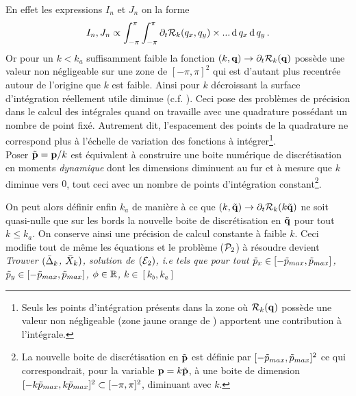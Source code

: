 \documentclass[10.5pt]{article}
\begin{document}
\begin{multicols}{2}
En effet les expressions $I_n$ et $J_n$ on la forme
\begin{equation}
	I_n, J_n \propto \int_{-\pi}^{\pi}  \int_{-\pi}^{\pi} \partial_t \mathcal{R}_k(q_x, q_y)\times ... \, \text{d} \, q_x \, \text{d} \, q_y \, .
\end{equation}
Or pour un $k < k_a$ suffisamment faible la fonction $(k,{\bf q}) \to \partial_t \mathcal{R}_k({\bf q})$ possède une valeur non négligeable sur une zone de $[-\pi, \pi]^2$ qui est d'autant plus recentrée autour de l'origine que $k$ est faible. Ainsi pour $k$ décroissant la surface d'intégration réellement utile diminue (c.f. ). Ceci pose des problèmes de précision dans le calcul des intégrales quand on travaille avec une quadrature possédant un nombre de point fixé. Autrement dit, l'espacement des points de la quadrature ne correspond plus à l'échelle de variation des fonctions à intégrer\footnote{Seuls les points d'intégration présents dans la zone où $\mathcal{R}_k({\bf q})$ possède une valeur non négligeable (zone jaune orange de ) apportent une contribution à l'intégrale.}. \\
\indent
Poser $\tilde{{\bf p}} = {\bf p}/k$ est équivalent à construire une boite numérique de discrétisation en moments \textit{dynamique} dont les dimensions diminuent au fur et à mesure que $k$ diminue vers $0$, tout ceci avec un nombre de points d'intégration constant\footnote{La nouvelle boite de discrétisation en $\tilde{{\bf p}}$ est définie par $[-\tilde{p}_{max}, \tilde{p}_{max}]^2$ ce qui correspondrait, pour la variable ${\bf p}= k\tilde{{\bf p}}$, à une boite de dimension $[-k\tilde{p}_{max}, k\tilde{p}_{max}]^2 \subset [-\pi, \pi]^2$, diminuant avec $k$.}.


On peut alors définir enfin $k_a$ de manière à ce que $(k,\tilde{{\bf q}}) \to \partial_t \mathcal{R}_k(k\tilde{{\bf q}})$ ne soit quasi-nulle que sur les bords la nouvelle boite de discrétisation en $\tilde{{\bf q}}$ pour tout $k \le k_a$. On conserve ainsi une précision de calcul constante à faible $k$. Ceci modifie tout de même les équations et le problème ($\mathcal{P}_2$) à résoudre devient \\


\noindent
{\itshape Trouver $(\bar{\Delta}_k$, $\bar{X}_k)$, solution de $(\mathcal{E}_2)$, i.e tels que pour tout $\tilde{p}_x \in [-\tilde{p}_{max}, \tilde{p}_{max}]$, $\tilde{p}_y \in [-\tilde{p}_{max}, \tilde{p}_{max}]$, $\phi \in \mathbb{R}$, $k\in [k_b, k_a]$}


\end{multicols}
\end{document}
